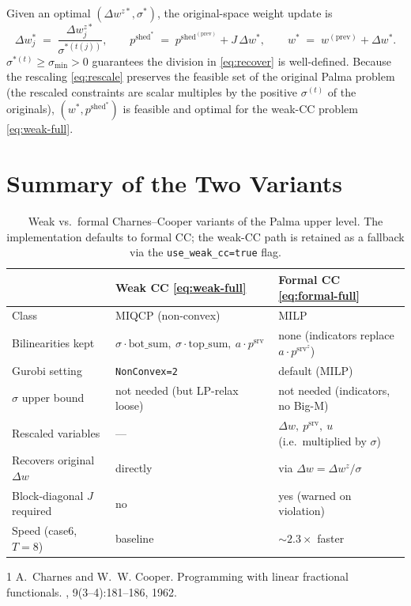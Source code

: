 \documentclass[11pt]{article}
\newcommand{\pshed}{p^{\mathrm{shed}}}
\newcommand{\pserved}{p^{\mathrm{srv}}}
\newcommand{\pprev}{\pshed^{(\mathrm{prev})}}
\newcommand{\wprev}{w^{(\mathrm{prev})}}
\begin{document}
Given an optimal $(\Delta w^{z*}, \sigma^{*})$, the original-space weight
update is
\begin{equation}\label{eq:recover}
    \Delta w_{j}^{*} \;=\; \frac{\Delta w^{z*}_{j}}{\sigma^{*(t(j))}},
    \qquad
    \pshed^{*} \;=\; \pprev + J\,\Delta w^{*},
    \qquad
    w^{*} \;=\; \wprev + \Delta w^{*}.
\end{equation}
$\sigma^{*(t)} \ge \sigma_{\min} > 0$ guarantees the division in
\eqref{eq:recover} is well-defined. Because the rescaling \eqref{eq:rescale}
preserves the feasible set of the original Palma problem (the rescaled
constraints are scalar multiples by the positive $\sigma^{(t)}$ of the
originals), $(w^{*}, \pshed^{*})$ is feasible and optimal for the
weak-CC problem \eqref{eq:weak-full}.

\section{Summary of the Two Variants}

\begin{table}[h]
\centering
\small
\begin{tabular}{@{}lll@{}}
\toprule
 & \textbf{Weak CC \eqref{eq:weak-full}} & \textbf{Formal CC \eqref{eq:formal-full}} \\
\midrule
Class & MIQCP (non-convex) & MILP \\
Bilinearities kept & $\sigma\cdot\mathrm{bot\_sum},\ \sigma\cdot\mathrm{top\_sum},\ a\cdot \pserved$ & none (indicators replace $a\cdot \pserved^{z}$) \\
Gurobi setting & \texttt{NonConvex=2} & default (MILP) \\
$\sigma$ upper bound & not needed (but LP-relax loose) & not needed (indicators, no Big-M) \\
Rescaled variables & --- & $\Delta w,\ \pserved,\ u$ (i.e.\ multiplied by $\sigma$) \\
Recovers original $\Delta w$ & directly & via $\Delta w = \Delta w^{z} / \sigma$ \\
Block-diagonal $J$ required & no & yes (warned on violation) \\
Speed (case6, $T{=}8$) & baseline & $\sim 2.3\times$ faster \\
\bottomrule
\end{tabular}
\caption{Weak vs.\ formal Charnes--Cooper variants of the Palma upper level.
The implementation defaults to formal CC; the weak-CC path is retained as a
fallback via the \texttt{use\_weak\_cc=true} flag.}
\end{table}

\begin{thebibliography}{1}
A.~Charnes and W.~W. Cooper.
\newblock Programming with linear fractional functionals.
, 9(3--4):181--186, 1962.
\end{thebibliography}
\end{document}
